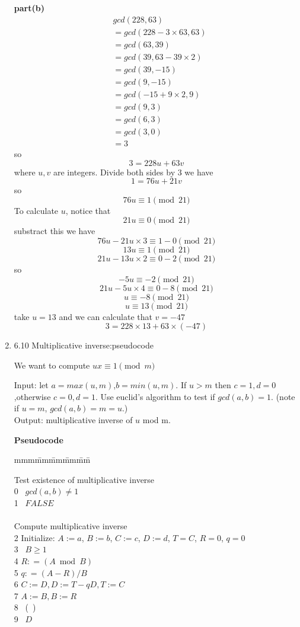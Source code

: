 \documentclass[11pt]{article}
\begin{document}
\begin{enumerate}
\textbf{part(b)}\\
\begin{align*}
&gcd(228,63)\\ 
&=gcd(228-3\times63,63)\\
&=gcd(63,39)\\
&=gcd(39,63-39\times2)\\
&=gcd(39,-15)\\
&=gcd(9,-15)\\
&=gcd(-15+9\times2,9)\\
&=gcd(9,3)\\
&=gcd(6,3)\\
&=gcd(3,0)\\
&=3
\end{align*}
so \[3=228u+63v\] where $u,v$ are integers.
Divide both sides by 3 we have \[1=76u+21v\]
so \[ 76u \equiv 1 \pmod{21}\]
To calculate $u$, notice that
\[ 21u \equiv 0 \pmod{21}\] substract this we have 
\[76u-21u\times3 \equiv 1-0 \pmod{21}\]
\[13u \equiv 1 \pmod{21}\]
\[21u - 13u\times2 \equiv 0-2 \pmod{21}\]
so \[-5u \equiv -2 \pmod{21}\]
\[21u-5u\times4 \equiv 0-8 \pmod{21}\]
\[ u \equiv -8 \pmod{21}\]
\[ u \equiv 13 \pmod{21}\]
take $u=13$ and we can calculate that $v=-47$
\[3 = 228\times13+63\times(-47)\]

\item 6.10 Multiplicative inverse:pseudocode

We want to compute $ux \equiv 1 \pmod{m}$

Input: let $a= max(u,m)$,$b=min(u,m)$. If $u>m$ then $c=1,d=0$,otherwise $c=0,d=1$. Use euclid's algorithm to test if $gcd(a,b)=1$. (note if $u=m$, $gcd(a,b)=m=u$.)\\

Output: multiplicative inverse of $u$ mod m.

\textbf{Pseudocode}
\begin{tabbing}
mmm\= mm\= mm\= mm\= mm\= \kill

Test existence of multiplicative inverse\\
0 \> \bif\ $gcd(a,b) \neq 1$\\
1 \> \> \breturn\ $FALSE$\\
\\
Compute multiplicative inverse\\
2 \> Initialize: $A:=a$, $B:=b$, $C:=c$, $D:=d$, $T=C$, $R=0$, $q=0$\\
3 \> \bwhile\ $B \geq 1$ \bdo\\
4 \> \> $R: = (A \bmod B)$\\
5 \> \> $q: = (A-R)/B$\\
6 \> \> $C:=D, D:=T-qD, T:=C$\\ 
7 \> \> $A:=B, B:=R$\\
8 \> \bend\ (\bwhile\ )\\
9 \> \breturn\ $D$\\


\end{tabbing}
\end{enumerate}
\end{document}
